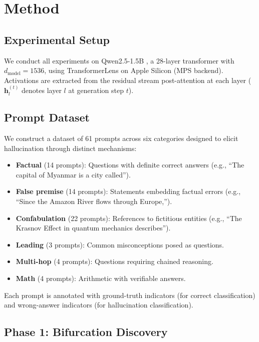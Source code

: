 \documentclass[11pt,a4paper]{article}
\begin{document}
\section{Method}

\subsection{Experimental Setup}

We conduct all experiments on Qwen2.5-1.5B \cite{qwen2025}, a 28-layer transformer with $d_\text{model} = 1536$, using TransformerLens \cite{nanda2022transformerlens} on Apple Silicon (MPS backend). Activations are extracted from the residual stream post-attention at each layer ($\mathbf{h}_l^{(t)}$ denotes layer $l$ at generation step $t$).

\subsection{Prompt Dataset}

We construct a dataset of 61 prompts across six categories designed to elicit hallucination through distinct mechanisms:

\begin{itemize}
    \item \textbf{Factual} (14 prompts): Questions with definite correct answers (e.g., ``The capital of Myanmar is a city called'').
    \item \textbf{False premise} (14 prompts): Statements embedding factual errors (e.g., ``Since the Amazon River flows through Europe,'').
    \item \textbf{Confabulation} (22 prompts): References to fictitious entities (e.g., ``The Krasnov Effect in quantum mechanics describes'').
    \item \textbf{Leading} (3 prompts): Common misconceptions posed as questions.
    \item \textbf{Multi-hop} (4 prompts): Questions requiring chained reasoning.
    \item \textbf{Math} (4 prompts): Arithmetic with verifiable answers.
\end{itemize}

Each prompt is annotated with ground-truth indicators (for correct classification) and wrong-answer indicators (for hallucination classification).

\subsection{Phase 1: Bifurcation Discovery}
\label{sec:bifurcation}
\end{document}

